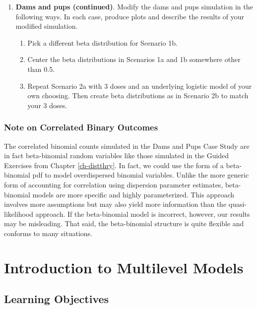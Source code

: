 \documentclass[
]{krantz}
\providecommand{\tightlist}{%
  \setlength{\itemsep}{0pt}\setlength{\parskip}{0pt}}
\begin{document}
\begin{enumerate}
\def\labelenumi{\arabic{enumi}.}
\setcounter{enumi}{1}
\item
  \textbf{Dams and pups (continued)}. Modify the dams and pups simulation in the following ways. In each case, produce plots and describe the results of your modified simulation.

  \begin{enumerate}
  \def\labelenumii{\alph{enumii}.}
  \tightlist
  \item
    Pick a different beta distribution for Scenario 1b.
  \item
    Center the beta distributions in Scenarios 1a and 1b somewhere other than 0.5.
  \item
    Repeat Scenario 2a with 3 doses and an underlying logistic model of your own choosing. Then create beta distributions as in Scenario 2b to match your 3 doses.
  \end{enumerate}
\end{enumerate}

\hypertarget{note-on-correlated-binary-outcomes}{%
\subsection{Note on Correlated Binary Outcomes}\label{note-on-correlated-binary-outcomes}}

The correlated binomial counts simulated in the Dams and Pups Case Study are in fact beta-binomial random variables like those simulated in the Guided Exercises from Chapter \ref{ch-distthry}. In fact, we could use the form of a beta-binomial pdf to model overdispersed binomial variables. Unlike the more generic form of accounting for correlation using dispersion parameter estimates, beta-binomial models are more specific and highly parameterized. This approach involves more assumptions but may also yield more information than the quasi-likelihood approach. If the beta-binomial model is incorrect, however, our results may be misleading. That said, the beta-binomial structure is quite flexible and conforms to many situations.

\hypertarget{ch-multilevelintro}{%
\chapter{Introduction to Multilevel Models}\label{ch-multilevelintro}}

\hypertarget{learning-objectives-7}{%
\section{Learning Objectives}\label{learning-objectives-7}}
\end{document}
